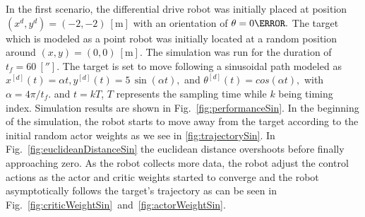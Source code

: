\documentclass[conference]{IEEEtran}
\begin{document}
 
 In the first scenario, the differential drive robot was initially placed at
 position $(x^d,y^d) = (-2,-2)~[\si{\meter}] $ with an orientation of $\theta =
 0\degree.$ The target which is modeled as a point robot was initially located
 at a random position around $(x,y) = (0,0)~[\si{\meter}].$ The simulation was
 run for the duration of $t_f=60~[\second].$ The target is set to move following
 a sinusoidal path modeled as $ x^{[d]}(t) = \alpha t, %
 y^{[d]}(t) = 5 \,\sin(\alpha t),$ and %
 $\theta^{[d]}(t) = cos(\alpha t), $ with $\alpha = 4\pi/t_f.$ and $t=kT$, $T$
 represents the sampling time while $k$ being timing index. Simulation results
 are shown in Fig.~\ref{fig:performanceSin}. In the beginning of the simulation,
 the robot starts to move away from the target according to the initial random
 actor weights as we see in \ref{fig:trajectorySin}. In Fig.~\ref{fig:euclideanDistanceSin} the euclidean distance overshoots before finally
 approaching zero. As the robot collects more data, the robot adjust the control
 actions as the actor and critic weights started to converge and the robot
 asymptotically follows the target's trajectory as can be seen in Fig.~\ref{fig:criticWeightSin}~and~\ref{fig:actorWeightSin}. %
%
\end{document}
